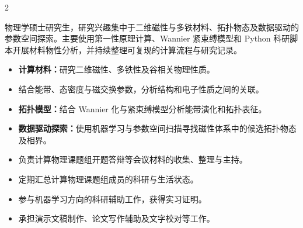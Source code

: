 \documentclass[10pt,a4paper,withhyper,ragged2e]{altacv}
\begin{document}
\makecvheader

\begin{paracol}{2}


物理学硕士研究生，研究兴趣集中于二维磁性与多铁材料、拓扑物态及数据驱动的参数空间探索。主要使用第一性原理计算、Wannier 紧束缚模型和 Python 科研脚本开展材料物性分析，并持续整理可复现的计算流程与研究记录。


\begin{itemize}
  \item \textbf{计算材料：}研究二维磁性、多铁性及谷相关物理性质。
  \item 结合能带、态密度与磁交换参数，分析结构和电子性质之间的关联。
\end{itemize}

\divider

\begin{itemize}
  \item \textbf{拓扑模型：}结合 Wannier 化与紧束缚模型分析能带演化和拓扑表征。
  \item \textbf{数据驱动探索：}使用机器学习与参数空间扫描寻找磁性体系中的候选拓扑物态及相界。
\end{itemize}


\begin{itemize}
  \item 负责计算物理课题组开题答辩等会议材料的收集、整理与主持。
  \item 定期汇总计算物理课题组成员的科研与生活状态。
\end{itemize}

\divider

\begin{itemize}
  \item 参与机器学习方向的科研辅助工作，获得实习证明。
  \item 承担演示文稿制作、论文写作辅助及文字校对等工作。
\end{itemize}


\end{paracol}
\end{document}
